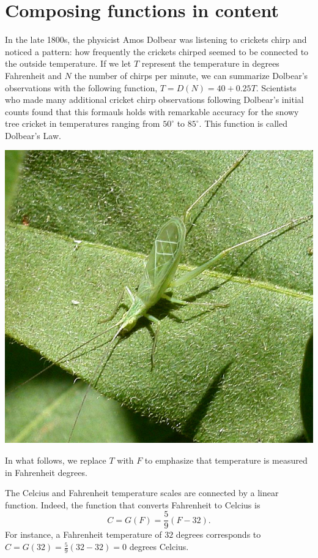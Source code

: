 \documentclass{ximera}
\begin{document}

\section{Composing functions in content}
In the late 1800s, the physicist Amos Dolbear was listening to crickets chirp and noticed a pattern: how frequently the crickets chirped seemed to be connected to the outside temperature. If we let $T$ represent the temperature in degrees Fahrenheit and $N$ the number of chirps per minute, we can summarize Dolbear's observations with the following function, $T=D(N)=40+0.25T$.  Scientists who made many additional cricket chirp observations following Dolbear's initial counts found that this formauls holds with remarkable accuracy for the snowy tree cricket in temperatures ranging from $50^\circ$ to $85^\circ$.  This function is called Dolbear's Law.

\begin{image}
\includegraphics[width=.7\textwidth]{CompositionText3.jpg}
\end{image}

In what follows, we replace $T$ with $F$ to emphasize that temperature is measured in Fahrenheit degrees.

The Celcius and Fahrenheit temperature scales are connected by a linear function.  Indeed, the function that converts Fahrenheit to Celcius is%
\begin{equation*}
C = G(F) = \frac{5}{9}(F-32)\text{.}
\end{equation*}
For instance, a Fahrenheit temperature of $32$ degrees corresponds to $C = G(32) =\frac{5}{9}(32-32)= 0$ degrees Celcius.
\end{document}
